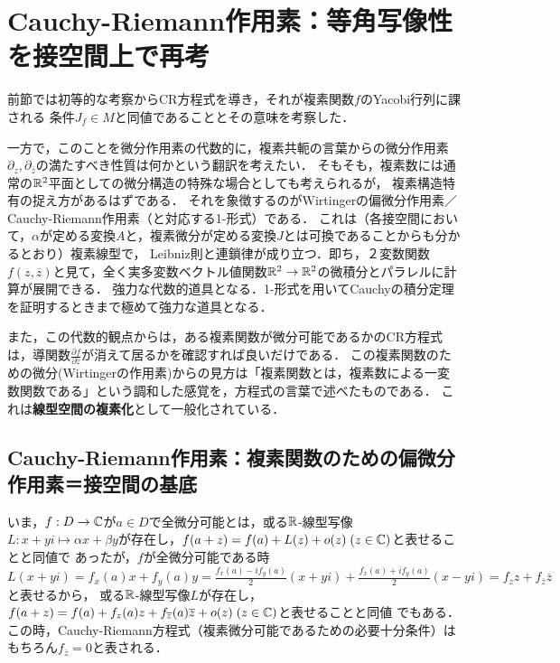 \documentclass[uplatex, dvipdfmx]{jsreport}
\begin{document}
\section{Cauchy-Riemann作用素：等角写像性を接空間上で再考}

\begin{screen}
    前節では初等的な考察からCR方程式を導き，それが複素関数$f$のYacobi行列に課される
    条件$J_f\in M$と同値であることとその意味を考察した．

    一方で，このことを微分作用素の代数的に，複素共軛の言葉からの微分作用素$\partial_z,\partial_{\overline{z}}$の満たすべき性質は何かという翻訳を考えたい．
    そもそも，複素数には通常の$\mathbb{R}^2$平面としての微分構造の特殊な場合としても考えられるが，
    複素構造特有の捉え方があるはずである．
    それを象徴するのがWirtingerの偏微分作用素／Cauchy-Riemann作用素（と対応する1-形式）である．
    これは（各接空間において，$\alpha$が定める変換$A$と，複素微分が定める変換$J$とは可換であることからも分かるとおり）複素線型で，
    Leibniz則と連鎖律が成り立つ．即ち，２変数関数$f(z,\overline{z})$と見て，全く実多変数ベクトル値関数$\mathbb{R}^2\to\mathbb{R}^2$の微積分とパラレルに計算が展開できる．
    強力な代数的道具となる．1-形式を用いてCauchyの積分定理を証明するときまで極めて強力な道具となる．

    また，この代数的観点からは，ある複素関数が微分可能であるかのCR方程式は，導関数$\frac{\partial f}{\partial\overline{z}}$が消えて居るかを確認すれば良いだけである．
    この複素関数のための微分(Wirtingerの作用素)からの見方は「複素関数とは，複素数による一変数関数である」という調和した感覚を，方程式の言葉で述べたものである．
    これは\textbf{線型空間の複素化}として一般化されている．
\end{screen}

\subsection{Cauchy-Riemann作用素：複素関数のための偏微分作用素＝接空間の基底}

\begin{discussion}\label{discussion-CR-equation}
    いま，$f:D\to\mathbb{C}$が$a\in D$で全微分可能とは，或る$\mathbb{R}$-線型写像$L:x+yi\mapsto\alpha x+\beta y$が存在し，$f(a+z)=f(a)+L(z)+o(z)\;(z\in\mathbb{C})$と表せることと同値で
    あったが，$f$が全微分可能である時$L(x+yi)=f_x(a)x+f_y(a)y=\frac{f_x(a)-if_y(a)}{2}(x+yi)+\frac{f_x(a)+if_y(a)}{2}(x-yi)=f_zz+f_{\overline{z}}\overline{z}$と表せるから，
    或る$\mathbb{R}$-線型写像$L$が存在し，$f(a+z)=f(a)+f_z(a)z+f_{\overline{z}}(a)\overline{z}+o(z)\;(z\in\mathbb{C})$と表せることと同値
    でもある．この時，Cauchy-Riemann方程式（複素微分可能であるための必要十分条件）はもちろん$f_{\overline{z}}=0$と表される．
\end{discussion}
\end{document}
